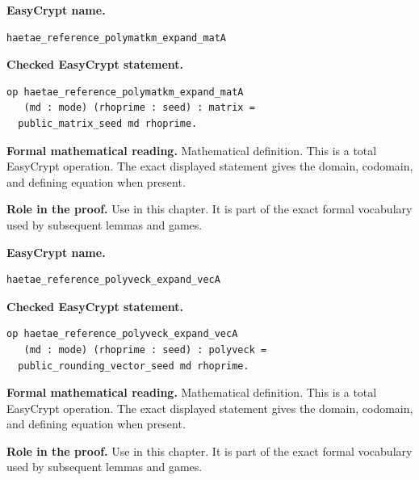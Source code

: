 \begin{formaldefinition}
\noindent\textbf{EasyCrypt name.}
\begin{lstlisting}[language=EasyCrypt,basicstyle=\ttfamily\scriptsize]
haetae_reference_polymatkm_expand_matA
\end{lstlisting}
\noindent\textbf{Checked EasyCrypt statement.}
\begin{lstlisting}[language=EasyCrypt,basicstyle=\ttfamily\scriptsize]
op haetae_reference_polymatkm_expand_matA
   (md : mode) (rhoprime : seed) : matrix =
  public_matrix_seed md rhoprime.
\end{lstlisting}
\noindent\textbf{Formal mathematical reading.}
Mathematical definition. This is a total EasyCrypt operation.  The exact displayed statement gives the domain, codomain, and defining equation when present.

\noindent\textbf{Role in the proof.}
Use in this chapter. It is part of the exact formal vocabulary used by subsequent lemmas and games.

\end{formaldefinition}

\begin{formaldefinition}
\noindent\textbf{EasyCrypt name.}
\begin{lstlisting}[language=EasyCrypt,basicstyle=\ttfamily\scriptsize]
haetae_reference_polyveck_expand_vecA
\end{lstlisting}
\noindent\textbf{Checked EasyCrypt statement.}
\begin{lstlisting}[language=EasyCrypt,basicstyle=\ttfamily\scriptsize]
op haetae_reference_polyveck_expand_vecA
   (md : mode) (rhoprime : seed) : polyveck =
  public_rounding_vector_seed md rhoprime.
\end{lstlisting}
\noindent\textbf{Formal mathematical reading.}
Mathematical definition. This is a total EasyCrypt operation.  The exact displayed statement gives the domain, codomain, and defining equation when present.

\noindent\textbf{Role in the proof.}
Use in this chapter. It is part of the exact formal vocabulary used by subsequent lemmas and games.

\end{formaldefinition}

